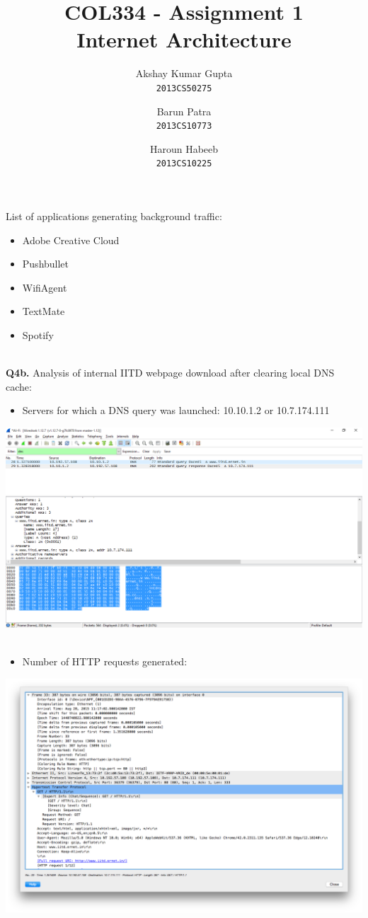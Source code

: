 \documentclass[12pt]{article}
\begin{document}
\title{COL334 - Assignment 1\\ Internet Architecture}
\author{Akshay Kumar Gupta\\\texttt{2013CS50275} \and  Barun Patra\\\texttt{2013CS10773} \and Haroun Habeeb\\\texttt{2013CS10225}}
\date{}
\maketitle
{} List of applications generating background traffic:
\begin{itemize}
\item Adobe Creative Cloud
\item Pushbullet
\item WifiAgent
\item TextMate
\item Spotify
\end{itemize}
~\\
{\bfseries Q4b.} Analysis of internal IITD webpage download after clearing local DNS cache:
\begin{itemize}
\item Servers for which a DNS query was launched: 10.10.1.2 or 10.7.174.111
\end{itemize}
{\includegraphics[scale=0.45]{../Screenshots/dns-reply2.png}
}
~\\
\begin{itemize}
\item Number of HTTP requests generated:  
\end{itemize}
{\includegraphics[scale=0.38]{../Screenshots/http-get-request.png}
}
~\\
\end{document}
